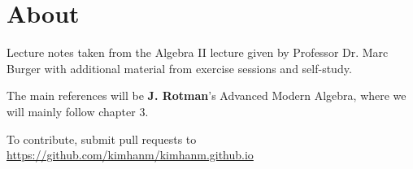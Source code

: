\section*{About}

Lecture notes taken from the Algebra II lecture given by Professor Dr. Marc Burger with additional material from exercise sessions and self-study.

The main references will be \textbf{J. Rotman}'s Advanced Modern Algebra, where we will mainly follow chapter 3.



To contribute, submit pull requests to \url{https://github.com/kimhanm/kimhanm.github.io}




